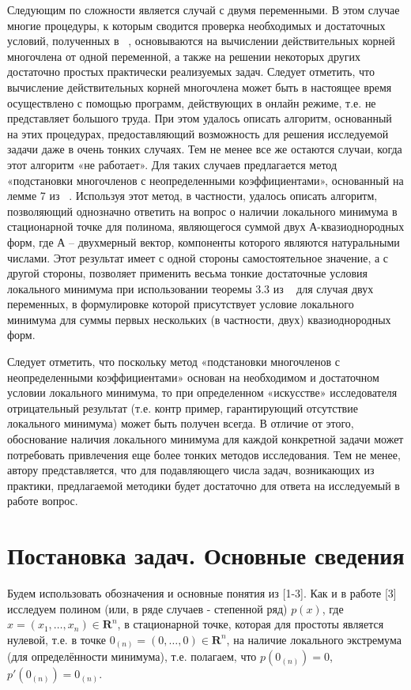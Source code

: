 Следующим по сложности является случай с двумя переменными. В этом случае многие процедуры, к которым сводится проверка необходимых и достаточных условий, полученных в ~\cite{nef:1, nef:2, nef:3}, основываются на вычислении действительных корней многочлена от одной переменной, а также на решении некоторых других достаточно простых практически реализуемых задач. Следует отметить, что вычисление действительных корней многочлена может быть в настоящее время осуществлено с помощью программ, действующих в онлайн режиме, т.е. не представляет большого труда. При этом удалось описать алгоритм, основанный на этих процедурах, предоставляющий возможность для решения исследуемой задачи даже в очень тонких случаях. Тем не менее все же остаются случаи, когда этот алгоритм «не работает». Для таких случаев предлагается метод «подстановки многочленов с неопределенными коэффициентами», основанный на лемме 7 из ~\cite{nef:2}. Используя этот метод, в частности, удалось описать алгоритм, позволяющий однозначно ответить на вопрос о наличии локального минимума в стационарной точке для полинома, являющегося суммой двух А-квазиоднородных форм, где А – двухмерный вектор, компоненты которого являются натуральными числами. Этот результат имеет с одной стороны самостоятельное значение, а с другой стороны, позволяет применить весьма тонкие достаточные условия локального минимума при использовании теоремы 3.3 из ~\cite{nef:3} для случая двух переменных, в формулировке которой присутствует условие локального минимума для суммы первых нескольких (в частности, двух) квазиоднородных форм.
 
Следует отметить, что поскольку метод «подстановки многочленов с неопределенными коэффициентами» основан на необходимом и достаточном условии локального минимума, то при определенном «искусстве» исследователя отрицательный результат (т.е. контр пример, гарантирующий отсутствие локального минимума) может быть получен всегда. В отличие от этого, обоснование наличия локального минимума для каждой конкретной задачи может потребовать привлечения еще более тонких методов исследования. Тем не менее, автору представляется, что для подавляющего числа задач, возникающих из практики, предлагаемой методики будет достаточно для ответа на исследуемый в работе вопрос.

\section{Постановка задач. Основные сведения} %
Будем использовать обозначения и основные понятия из [1-3]. Как и в работе [3] исследуем полином (или, в ряде случаев - степенной ряд) $p(x)$, где $x = (x_1,\dots, x_n) \in \mathbf{R}^n$, в стационарной точке, которая для простоты является нулевой, т.е. в точке $0_{(n)} = (0,\dots,0) \in \mathbf{R}^n$, на наличие локального экстремума (для определённости минимума), т.е. полагаем, что $p(0_{(n)}) = 0$, $p'(0_{(n)}) = 0_{(n)}$.

